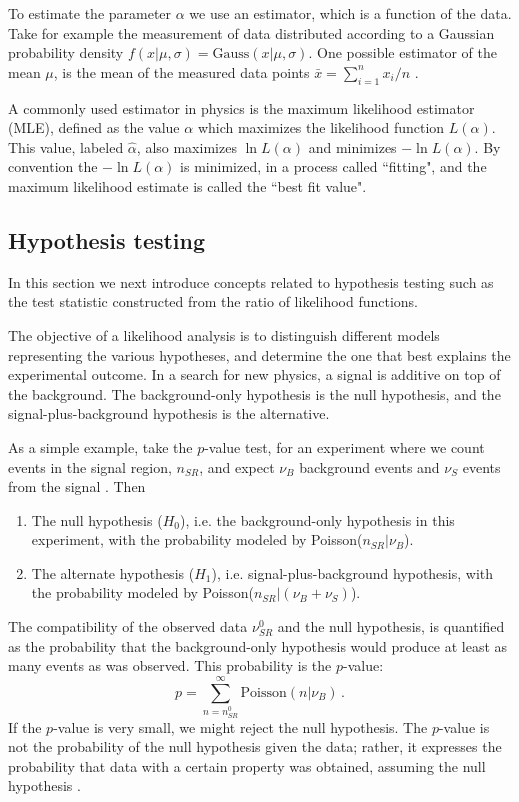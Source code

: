 To estimate the parameter $\alpha$ we use an estimator, which is a function of the data. Take for example the measurement of data distributed according to a Gaussian probability density $f(x| \mu,\sigma) = \text{Gauss}(x|\mu,\sigma)$. One possible estimator of the mean $\mu$, is the mean of the measured data points $\bar{x} = \sum_{i = 1}^{n} x_i / n$ \cite{2011-Statistics-Cranmer}. 

A commonly used estimator in physics is the maximum likelihood estimator (MLE), defined as the value $\alpha$ which maximizes the likelihood function $L(\alpha)$. This value, labeled $\hat{\alpha}$, also maximizes $\ln L(\alpha)$ and minimizes $-\ln L(\alpha)$. By convention the $-\ln L(\alpha)$ is minimized, in a process called ``fitting", and the maximum likelihood estimate is called the ``best fit value". 





\subsection{Hypothesis testing}
In this section we next introduce concepts related to hypothesis testing such as the test statistic constructed from the ratio of likelihood functions.

The objective of a likelihood analysis is to distinguish different models representing the various hypotheses, and determine the one that best explains the experimental outcome. In a search for new physics, a signal is additive on top of the background. The background-only hypothesis is the null hypothesis, and the signal-plus-background hypothesis is the alternative. 

As a simple example, take the $p$-value test, for an experiment where we count events in the signal region, $n_{SR}$, and expect $\nu_B$ background events and $\nu_S$ events from the signal \cite{2011-Statistics-Cranmer}. Then 
\begin{enumerate}
    \item The null hypothesis ($H_0$), i.e. the background-only hypothesis in this experiment, with the probability modeled by Poisson($n_{SR}|\nu_B$).
    \item The alternate hypothesis ($H_1$), i.e. signal-plus-background hypothesis, with the probability modeled by Poisson($n_{SR}|(\nu_B + \nu_S)$).
\end{enumerate}
The compatibility of the observed data $\nu^0_{SR}$ and the null hypothesis, is quantified as the probability that the background-only hypothesis would produce at least as many events as was observed. This probability is the $p$-value: 
\begin{equation}
    p = \sum_{n = n^0_{SR}}^{\infty} \text{Poisson}(n | \nu_B) \, .
\end{equation}
If the $p$-value is very small, we might reject the null hypothesis. The $p$-value is not the probability of the null hypothesis given the data; rather, it expresses the probability that data with a certain property was obtained, assuming the null hypothesis \cite{2011-Statistics-Cranmer}.

